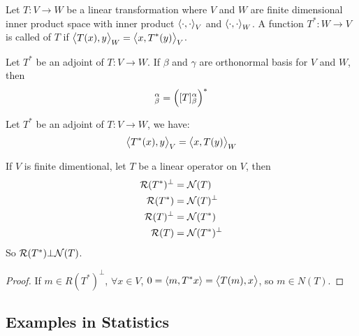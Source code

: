\begin{definition}
    Let $T : V \rightarrow W$ be a linear transformation where $V$ and $W$ are finite dimensional inner product space with inner product $\innerproduct{\cdot{}}{\cdot{}}_V$ and $\innerproduct{\cdot{}}{\cdot{}}_W$. A function $T^* : W \rightarrow V$ is called  of $T$ if $\innerproduct{T(x)}{y}_W = \innerproduct{x}{T^*(y)}_V$.
\end{definition}

\begin{theorem}
    Let $T^*$ be an adjoint of $T: V \rightarrow W$. If $\beta$ and $\gamma$ are orthonormal basis for $V$ and $W$, then
    \begin{equation}
        [T^*]_\beta^\alpha = \mleft([T]_\beta^\alpha\mright)^*
    \end{equation}
\end{theorem}

\begin{theorem}
    Let $T^*$ be an adjoint of $T: V \rightarrow W$, we have:
    \begin{equation}
        \innerproduct{T^*(x)}{y}_V = \innerproduct{x}{T(y)}_W
    \end{equation}
\end{theorem}



\begin{theorem}\label{nullandreciprocaladjoint}
    If $V$ is finite dimentional, let $T$ be a linear operator on $V$, then
    \begin{equation*}
        \begin{aligned}
            \mathcal{R}(T^*)^\bot &= \mathcal{N}(T)\\
            \mathcal{R}(T^*) &= \mathcal{N}(T)^\bot \\
            \mathcal{R}(T)^\bot &= \mathcal{N}(T^*)\\
            \mathcal{R}(T) &= \mathcal{N}(T^*)^\bot
        \end{aligned}
    \end{equation*}
    So $\mathcal{R}(T^*) \bot \mathcal{N}(T)$.
\end{theorem}
\begin{proof}
    If $m \in R(T^*)^\bot$, $\forall x \in V$, $0 = \innerproduct{m}{T^*x} = \innerproduct{T(m)}{x}$, so $m \in N(T)$.
\end{proof}



\subsection{Examples in Statistics}\label{consistentandinconsistentequation}

